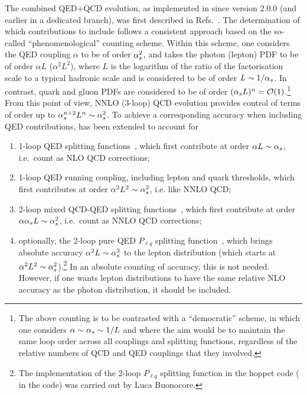The combined QED+QCD evolution, as implemented in \hoppet since
version 2.0.0 (and earlier in a dedicated  branch), was first
described in
Refs.~\cite{Manohar:2016nzj,Manohar:2017eqh,Buonocore:2020nai,Buonocore:2021bsf}.
%
The determination of which contributions to include follows a
consistent approach based on the so-called ``phenomenological'' counting
scheme.
%
Within this scheme, one considers the QED coupling $\alpha$ to be of order $\alpha_s^2$, and takes the
photon (lepton) PDF to be of order $\alpha L$ ($\alpha^2 L^2$), where
$L$ is the logarithm of the
ratio of the factorisation scale to a typical hadronic scale and is considered to be of order $L \sim 1/\alpha_s$.
In contrast, quark and gluon
PDFs are considered to be of order $(\alpha_s L)^n={\cal O}(1)$.\footnote{The
  above counting is to be contrasted with a ``democratic'' scheme, in
  which one considers $\alpha \sim \alpha_s \sim 1/L$ and where the aim would be to maintain
  the same loop order across all couplings and splitting functions,
  regardless of the relative numbers of QCD and QED couplings that
  they involved.}
%
From this point of view, NNLO (3-loop) QCD evolution provides control of
terms of order up to $\alpha_s^{n+2} L^n \sim \alpha_s^2$.
%
To achieve a corresponding accuracy when including QED contributions,
\hoppet has been extended to account for
\begin{enumerate}
\item \label{item:qed1} 1-loop QED splitting functions~\cite{Roth:2004ti}, which first
  contribute at order $\alpha L \sim \alpha_s$, i.e.\ count as NLO QCD
  corrections;
  
\item \label{item:qed2} 1-loop QED running coupling, including lepton and quark
  thresholds, which first contributes at order $\alpha^2 L^2 \sim
  \alpha_s^2$, i.e. like NNLO QCD; 
  
\item \label{item:qed3} 2-loop mixed QCD-QED splitting
  functions~\cite{deFlorian:2015ujt},
  which first contribute at order
  $\alpha \alpha_s L \sim \alpha_s^2$, i.e.\ count as NNLO QCD corrections;

\item \label{item:qed4} optionally, the 2-loop pure QED $P_{\ell q}$ splitting
  function~\cite{deFlorian:2016gvk}, which brings absolute accuracy
  $\alpha^2 L\sim \alpha_s^3$ to the lepton distribution (which starts at
  $\alpha^2 L^2 \sim \alpha_s^2$).\footnote{The implementation of the 2-loop $P_{\ell q}$ splitting
  function in the hoppet code ( in the code) was carried out by Luca Buonocore.}
  In an absolute counting of accuracy, this is not needed.
  However, if one wants lepton distributions to have the same relative
  NLO accuracy as the photon distribution, it should be
  included.
\end{enumerate}
